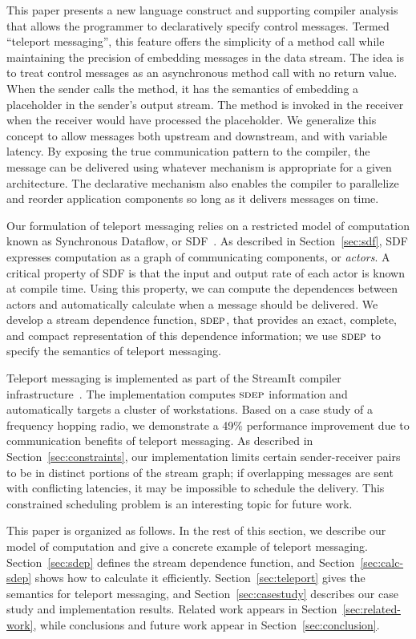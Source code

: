 This paper presents a new language construct and supporting compiler
analysis that allows the programmer to declaratively specify control
messages.  Termed ``teleport messaging'', this feature offers the
simplicity of a method call while maintaining the precision of
embedding messages in the data stream.  The idea is to treat control
messages as an asynchronous method call with no return value.  When
the sender calls the method, it has the semantics of embedding a
placeholder in the sender's output stream.  The method is invoked in
the receiver when the receiver would have processed the placeholder.
We generalize this concept to allow messages both upstream and
downstream, and with variable latency.  By exposing the true
communication pattern to the compiler, the message can be delivered
using whatever mechanism is appropriate for a given architecture.  The
declarative mechanism also enables the compiler to parallelize and
reorder application components so long as it delivers messages on
time.

Our formulation of teleport messaging relies on a restricted model of
computation known as Synchronous Dataflow, or SDF~\cite{LM87-i}.  As
described in Section~\ref{sec:sdf}, SDF expresses computation as a
graph of communicating components, or {\it actors}.  A critical
property of SDF is that the input and output rate of each actor is
known at compile time.  Using this property, we can compute the
dependences between actors and automatically calculate when a message
should be delivered.  We develop a stream dependence function,
$\textsc{sdep}$, that provides an exact, complete, and compact representation
of this dependence information; we use $\textsc{sdep}$ to specify the
semantics of teleport messaging.

Teleport messaging is implemented as part of the StreamIt compiler
infrastructure~\cite{streamitcc}.  The implementation computes $\textsc{sdep}$
information and automatically targets a cluster of workstations.
Based on a case study of a frequency hopping radio, we demonstrate a
49\% performance improvement due to communication benefits of teleport
messaging.  As described in Section~\ref{sec:constraints}, our
implementation limits certain sender-receiver pairs to be in distinct
portions of the stream graph; if overlapping messages are sent with
conflicting latencies, it may be impossible to schedule the delivery.
This constrained scheduling problem is an interesting topic for future
work.

This paper is organized as follows.  In the rest of this
section, we describe our model of computation and give a concrete
example of teleport messaging.  Section~\ref{sec:sdep} defines the
stream dependence function, and Section~\ref{sec:calc-sdep} shows how
to calculate it efficiently.  Section~\ref{sec:teleport} gives the
semantics for teleport messaging, and Section~\ref{sec:casestudy}
describes our case study and implementation results.  
Related work appears in Section~\ref{sec:related-work}, while
conclusions and future work appear in Section~\ref{sec:conclusion}.

